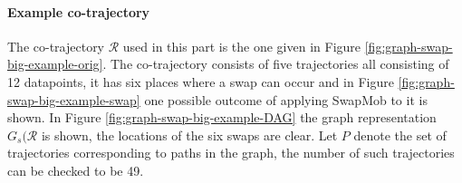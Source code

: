 \documentclass[12pt]{article}
\newcommand{\cotraj}{\mathcal{R}}
\newcommand{\paths}{P}
\newcommand{\swapgraph}{G_s}
\theoremstyle{definition}
\begin{document}
\paragraph{Example co-trajectory}
The co-trajectory \(\cotraj\) used in this part is the one given in
Figure \ref{fig:graph-swap-big-example-orig}. The co-trajectory
consists of five trajectories all consisting of 12 datapoints, it has
six places where a swap can occur and in Figure
\ref{fig:graph-swap-big-example-swap} one possible outcome of applying
SwapMob to it is shown. In Figure \ref{fig:graph-swap-big-example-DAG}
the graph representation \(\swapgraph(\cotraj\) is shown, the
locations of the six swaps are clear. Let \(\paths\) denote the set of
trajectories corresponding to paths in the graph, the number of such
trajectories can be checked to be 49.
\end{document}
